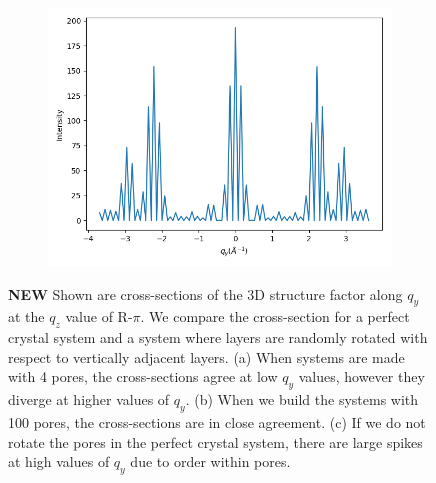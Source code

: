\documentclass{article}
\begin{document}
\begin{figure}[!htb]
\begin{subfigure}{0.3\textwidth}
  \includegraphics[width=\textwidth]{perfect_crystal_same_rotation_qy.png} 
  \caption{}\label{fig:perfect_crystal_same_rotation}
  \end{subfigure}
  \caption{\textbf{NEW} Shown are cross-sections of the 3D structure factor
  along $q_y$ at the $q_z$ value of R-$\pi$. We compare the cross-section for 
  a perfect crystal system and a system where layers are randomly rotated with
  respect to vertically adjacent layers. (a) When systems are made with 4 pores,
  the cross-sections agree at low $q_y$ values, however they diverge at higher
  values of $q_y$. (b) When we build the systems with 100 pores, the cross-sections
  are in close agreement. (c) If we do not rotate the pores in the perfect crystal
  system, there are large spikes at high values of $q_y$ due to order within pores.}\label{fig:perfect_v_layers}
  \end{figure}



\end{document}
